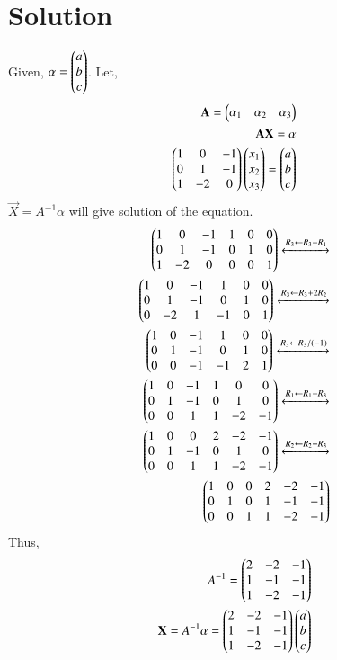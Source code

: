 \documentclass[journal,12pt,twocolumn]{IEEEtran}
\begin{document}
\section{Solution}
Given, $\alpha = \begin{pmatrix}a\\b\\c\end{pmatrix}$.
Let,
\begin{align}
\mathbf{A}=\begin{pmatrix}\alpha_1&\alpha_2&\alpha_3\end{pmatrix}\\
\mathbf{A}\mathbf{X}=\alpha\\
\begin{pmatrix}1 & 0 & -1\\0 & 1 & -1\\1 & -2 & 0\end{pmatrix}\begin{pmatrix}x_1\\x_2\\x_3\end{pmatrix} = \begin{pmatrix}a\\b\\c\end{pmatrix}
\end{align}
$ \vec{X}=A^{-1}\alpha$ will give solution of the equation.
\begin{align}
\begin{pmatrix}1 & 0 & -1 & 1 & 0 & 0\\
0 & 1 & -1 & 0 & 1 & 0\\
1 & -2 & 0 & 0 & 0 & 1\end{pmatrix}\xleftrightarrow[]{R_3\leftarrow R_3-R_1}\\
\begin{pmatrix}1 & 0 & -1 & 1 & 0 & 0\\
0 & 1 & -1 & 0 & 1 & 0\\
0 & -2 & 1 & -1 & 0 & 1\end{pmatrix}
\xleftrightarrow[]{R_3\leftarrow R_3+2R_2}\\
\begin{pmatrix}1 & 0 & -1 & 1 & 0 & 0\\
0 & 1 & -1 & 0 & 1 & 0\\
0 & 0 & -1 & -1 & 2 & 1\end{pmatrix}\xleftrightarrow[]{R_3\leftarrow R_3/(-1)}\\
\begin{pmatrix}1 & 0 & -1 & 1 & 0 & 0\\
0 & 1 & -1 & 0 & 1 & 0\\
0 & 0 & 1 & 1 & -2 & -1\end{pmatrix}\xleftrightarrow{R_1\leftarrow R_1+R_3}\\
\begin{pmatrix}1 & 0 & 0 & 2 & -2 & -1\\
0 & 1 & -1 & 0 & 1 & 0\\
0 & 0 & 1 & 1 & -2 & -1\end{pmatrix}\xleftrightarrow{R_2\leftarrow R_2+R_3}\\
\begin{pmatrix}1 & 0 & 0 & 2 & -2 & -1\\
0 & 1 & 0 & 1 & -1 & -1\\
0 & 0 & 1 & 1 & -2 & -1\end{pmatrix}
\end{align}
Thus,
\begin{align}
    A^{-1}=\begin{pmatrix}
    2 &-2&-1\\
    1&-1&-1\\
    1&-2&-1
    \end{pmatrix}\\
\mathbf{X} = A^{-1}\alpha=\begin{pmatrix}2 &-2&-1\\1&-1&-1\\1&-2&-1\end{pmatrix}
\begin{pmatrix}a\\b\\c\end{pmatrix}
\end{align}
\end{document}

